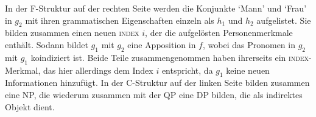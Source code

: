 In der F-Struktur auf der rechten Seite werden die Konjunkte 
`Mann' und  `Frau' in $g_2$ mit ihren grammatischen
Eigenschaften einzeln als $h_1$ und $h_2$ aufgelistet. Sie bilden zusammen
einen neuen \textsc{index} $i$, der die aufgelösten Personenmerkmale enthält. Sodann
bildet $g_1$ mit $g_2$ eine Apposition in $f$, wobei das Pronomen 
in $g_2$ mit $g_1$ koindiziert ist. Beide Teile zusammengenommen haben
ihrerseits ein \textsc{index}-Merkmal, das hier allerdings dem Index $i$ entspricht, da
$g_1$ keine neuen Informationen hinzufügt. In der C-Struktur auf der linken
Seite bilden  zusammen eine NP, die wiederum zusammen mit
der QP  eine DP bilden, die als indirektes Objekt dient.
